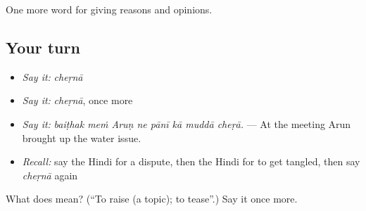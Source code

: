 \begin{grammarlens}[title={What you've built}]
One more word for giving reasons and opinions.
\end{grammarlens}

\subsection*{Your turn}
\begin{itemize}
\raggedright
  \item \emph{Say it:} \emph{cheṛnā}
  \item \emph{Say it:} \emph{cheṛnā}, once more
  \item \emph{Say it:} \emph{baiṭhak meṁ Aruṇ ne pānī kā muddā cheṛā.} — At the meeting Arun brought up the water issue.
  \item \emph{Recall:} say the Hindi for a dispute, then the Hindi for to get tangled, then say \emph{cheṛnā} again
\end{itemize}

\begin{tcolorbox}[breakable,colback=teal!4,colframe=teal!35!black,title={Before you move on}]
What does  mean? (\textquotedblleft{}To raise (a topic); to tease\textquotedblright{}.) Say it once more.
\end{tcolorbox}
